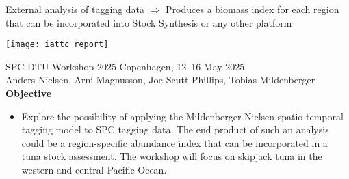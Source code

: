 \documentclass[aspectratio=169,fleqn]{beamer}
\begin{document}

\begin{frame}{External analysis of tagging data}
  \vspace{2ex}
  \green $\Rightarrow$ Produces a biomass index for each region\\[0.4ex]
  \phantom{$\Rightarrow$} that can be incorporated into Stock Synthesis or any
  other platform\\[1ex]
  \begin{center}
    \texttt{[image: iattc\_report]}
  \end{center}
\end{frame}


\begin{frame}{SPC-DTU Workshop 2025}
  Copenhagen, 12--16 May 2025\\[1ex]
  Anders Nielsen, Arni Magnusson, Joe Scutt Phillips, Tobias Mildenberger\\[3ex]
  \textbf{Objective}\\[1.5ex]
  \begin{itemize}
    \item[] Explore the possibility of applying the Mildenberger-Nielsen
    spatio-temporal\\
    tagging model to SPC tagging data. The end product of such an analysis\\
    could be a region-specific abundance index that can be incorporated in a\\
    tuna stock assessment. The workshop will focus on skipjack tuna in the\\
    western and central Pacific Ocean.\\[2ex]
  \end{itemize}
\end{frame}

\end{document}
